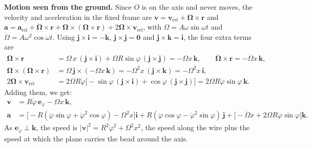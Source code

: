 \documentclass[11pt,a4paper]{article}
\newcommand{\dt}[1]{\dot{#1}}
\newcommand{\ddt}[1]{\ddot{#1}}
\newcommand{\ephi}{\bm{e}_\varphi}
\newcommand{\ii}{\bm{i}}
\newcommand{\jj}{\bm{j}}
\newcommand{\kk}{\bm{k}}
\begin{document}
\textbf{Motion seen from the ground.} Since $O$ is on the axis and never moves, the velocity and acceleration in the fixed frame are $\bm v=\bm v_{\text{rel}}+\bm\Omega\times\bm r$ and $\bm a=\bm a_{\text{rel}}+\dt{\bm\Omega}\times\bm r+\bm\Omega\times(\bm\Omega\times\bm r)+2\bm\Omega\times\bm v_{\text{rel}}$, with $\Omega=A\omega\sin\omega t$ and $\dt\Omega=A\omega^2\cos\omega t$. Using $\jj\times\ii=-\kk$, $\jj\times\jj=\bm 0$ and $\jj\times\kk=\ii$, the four extra terms are
\begin{align}
\bm\Omega\times\bm r&=\Omega\,x\,(\jj\times\ii)+\Omega R\sin\varphi\,(\jj\times\jj)=-\Omega x\,\kk,\qquad
\dt{\bm\Omega}\times\bm r=-\dt\Omega x\,\kk,\label{eq:prod1}\\
\bm\Omega\times(\bm\Omega\times\bm r)&=\Omega\,\jj\times(-\Omega x\,\kk)=-\Omega^2x\,(\jj\times\kk)=-\Omega^2x\,\ii,\label{eq:prod2}\\
2\bm\Omega\times\bm v_{\text{rel}}&=2\Omega R\dt\varphi\big[-\sin\varphi\,(\jj\times\ii)+\cos\varphi\,(\jj\times\jj)\big]=2\Omega R\dt\varphi\sin\varphi\,\kk .\label{eq:prod3}
\end{align}
Adding them, we get:
\begin{align}
\bm v&=R\dt\varphi\,\ephi-\Omega x\,\kk,\label{eq:vel}\\
\bm a&=\big[-R(\ddt\varphi\sin\varphi+\dt\varphi^2\cos\varphi)-\Omega^2x\big]\ii+R(\ddt\varphi\cos\varphi-\dt\varphi^2\sin\varphi)\,\jj+\big[-\dt\Omega x+2\Omega R\dt\varphi\sin\varphi\big]\kk .\label{eq:acc}
\end{align}
As $\ephi\perp\kk$, the speed is $|\bm v|^2=R^2\dt\varphi^2+\Omega^2x^2$, the speed along the wire plus the speed at which the plane carries the bead around the axis.
\end{document}

